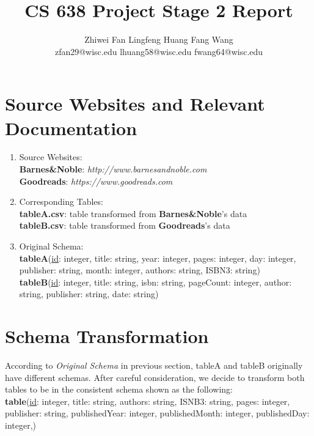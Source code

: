 \documentclass[10pt, oneside]{article}
\title{\textbf{CS 638 Project Stage 2 Report}}
\author{Zhiwei Fan\hspace{7ex}
	   Lingfeng Huang\hspace{7ex}
	   Fang Wang\\
	   zfan29@wisc.edu\hspace{3ex}
	   lhuang58@wisc.edu\hspace{3ex}
	   fwang64@wisc.edu
	   }
\begin{document}
\maketitle 

\section*{Source Websites and Relevant Documentation}
\begin{enumerate}
  	\item Source Websites:\\
		\textbf{Barnes\&Noble}: \textit{http://www.barnesandnoble.com}\\
		\textbf{Goodreads}: \textit{https://www.goodreads.com}
		
	\item Corresponding Tables:\\
		\textbf{tableA.csv}: table transformed from \textbf{Barnes\&Noble}'s data\\
		\textbf{tableB.csv}: table transformed from \textbf{Goodreads}'s data
		
	\item Original Schema:\\
		\textbf{tableA}(\underline{id}: integer, title: string, year: integer, pages: integer, day: integer, publisher: string, month: integer, authors: string, ISBN3: string)\\
		\textbf{tableB}(\underline{id}: integer, title: string, isbn: string, pageCount: integer, author: string, publisher: string, date: string)	
\end{enumerate}

\section*{Schema Transformation}
According to \textit{Original Schema} in previous section, tableA and tableB originally have different schemas. After careful consideration, we decide to transform both tables to 
be in the consistent schema shown as the following: 
\vspace{1ex}
 \\
 \textbf{table}(\underline{id}: integer, title: string, authors: string, ISNB3: string,  pages: integer, publisher: string, publishedYear: integer, publishedMonth: integer, publishedDay: integer,)
 
\end{document}

